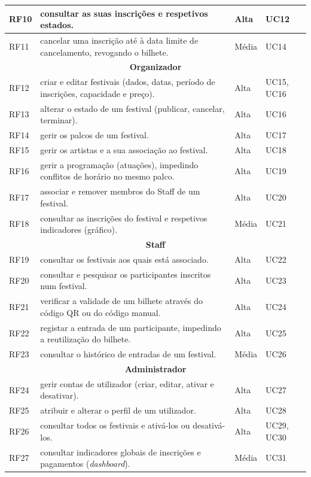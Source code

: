 \begin{longtable}{|l|p{8.6cm}|l|l|}
RF10 & consultar as suas inscrições e respetivos estados. & Alta & UC12 \\ \hline
RF11 & cancelar uma inscrição até à data limite de cancelamento, revogando o bilhete. & Média & UC14 \\ \hline
\multicolumn{4}{c}{\textbf{Organizador}} \\ \hline
RF12 & criar e editar festivais (dados, datas, período de inscrições, capacidade e preço). & Alta & UC15, UC16 \\ \hline
RF13 & alterar o estado de um festival (publicar, cancelar, terminar). & Alta & UC16 \\ \hline
RF14 & gerir os palcos de um festival. & Alta & UC17 \\ \hline
RF15 & gerir os artistas e a sua associação ao festival. & Alta & UC18 \\ \hline
RF16 & gerir a programação (atuações), impedindo conflitos de horário no mesmo palco. & Alta & UC19 \\ \hline
RF17 & associar e remover membros do Staff de um festival. & Alta & UC20 \\ \hline
RF18 & consultar as inscrições do festival e respetivos indicadores (gráfico). & Média & UC21 \\ \hline
\multicolumn{4}{c}{\textbf{Staff}} \\ \hline
RF19 & consultar os festivais aos quais está associado. & Alta & UC22 \\ \hline
RF20 & consultar e pesquisar os participantes inscritos num festival. & Alta & UC23 \\ \hline
RF21 & verificar a validade de um bilhete através do código QR ou do código manual. & Alta & UC24 \\ \hline
RF22 & registar a entrada de um participante, impedindo a reutilização do bilhete. & Alta & UC25 \\ \hline
RF23 & consultar o histórico de entradas de um festival. & Média & UC26 \\ \hline
\multicolumn{4}{c}{\textbf{Administrador}} \\ \hline
RF24 & gerir contas de utilizador (criar, editar, ativar e desativar). & Alta & UC27 \\ \hline
RF25 & atribuir e alterar o perfil de um utilizador. & Alta & UC28 \\ \hline
RF26 & consultar todos os festivais e ativá-los ou desativá-los. & Alta & UC29, UC30 \\ \hline
RF27 & consultar indicadores globais de inscrições e pagamentos (\emph{dashboard}). & Média & UC31 \\ \hline
\end{longtable}

